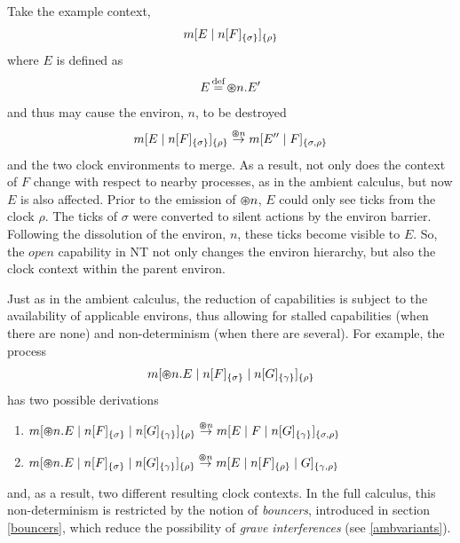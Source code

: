 Take the example context,
\begin{equation}
{m}[ E\;|\;{n}[ F ]_{\{\sigma\}} ]_{\{\rho\}}
\end{equation}
where $E$ is defined as
\begin{equation}
E \operatorname{\stackrel{\textrm{def}}{=}} \varoast n.E^\prime
\end{equation}
and thus may cause the environ, $n$, to be destroyed
\begin{equation}
{m}[ E\;|\;{n}[ F ]_{\{\sigma\}} ]_{\{\rho\}} \stackrel{\varoast n}{\rightarrow}
{m}[ E'^\prime\;|\;F ]_{\{\sigma, \rho\}}
\end{equation}
and the two clock environments to merge.  As a result, not
only does the context of $F$ change with respect to nearby processes, as
in the ambient calculus, but now $E$ is also affected.  Prior to the
emission of $\varoast n$, $E$ could only see ticks from the clock
$\rho$.  The ticks of $\sigma$ were converted to silent actions by the
environ barrier.  Following the dissolution of the environ, $n$, these
ticks become visible to $E$.  So, the $open$ capability in NT not only
changes the environ hierarchy, but also the clock context within the
parent environ.

Just as in the ambient calculus, the reduction of capabilities is
subject to the availability of applicable environs, thus allowing for
stalled capabilities (when there are none) and non-determinism (when
there are several). For example, the process
\begin{equation}
{m}[ \varoast n.E\;|\;{n}[ F ]_{\{\sigma\}}\;|\;{n}[ G ]_{\{\gamma\}} ]_{\{\rho\}}
\end{equation}
has two possible derivations

\begin{enumerate}
\item
      ${m}[ \varoast n.E\;|\;{n}[ F ]_{\{\sigma\}}\;|\;{n}[ G ]_{\{\gamma\}} ]_{\{\rho\}}
      \stackrel{\varoast n}{\rightarrow} {m}[ E \;|\; F \;|\;
      {n}[ G ]_{\{\gamma\}} ]_{\{\sigma , \rho\}}$
\item
      ${m}[ \varoast n.E\;|\;{n}[ F ]_{\{\sigma\}}\;|\;{n}[ G ]_{\{\gamma\}} ]_{\{\rho\}}
      \stackrel{\varoast n}{\rightarrow} {m}[ E \;|\; {n}[ F ]_{\{\rho\}} \;|\; G ]_{\{\gamma , \rho\}}$
\end{enumerate}
and, as a result, two different resulting clock contexts.  In
the full calculus, this non-determinism is restricted by the notion of
\emph{bouncers}, introduced in section \ref{bouncers}, which reduce the possibility of \emph{grave interferences} (see \ref{ambvariants}).  

